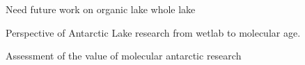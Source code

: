 

Need future work on organic lake whole lake

Perspective of Antarctic Lake research from wetlab to molecular age.

Assessment of the value of molecular antarctic research

